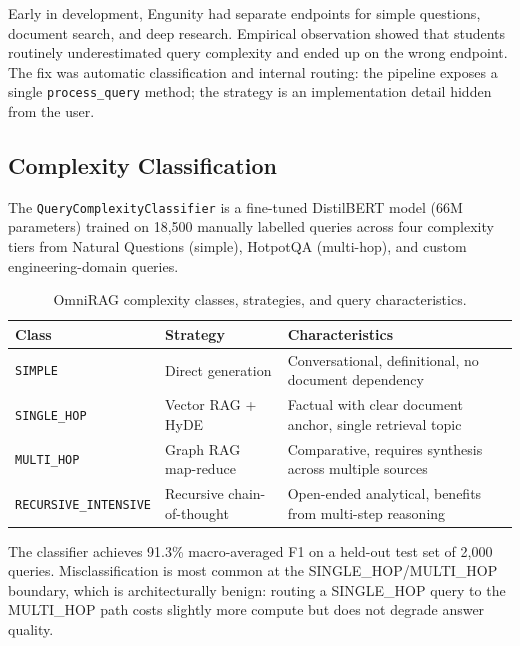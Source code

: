 Early in development, Engunity had separate endpoints for simple questions, document search, and deep research. Empirical observation showed that students routinely underestimated query complexity and ended up on the wrong endpoint. The fix was automatic classification and internal routing: the pipeline exposes a single \texttt{process\_query} method; the strategy is an implementation detail hidden from the user.

\subsection{Complexity Classification}
\label{subsec:complexity-classifier}

The \texttt{QueryComplexityClassifier} is a fine-tuned DistilBERT model (66M parameters) trained on 18,500 manually labelled queries across four complexity tiers from Natural Questions (simple), HotpotQA (multi-hop), and custom engineering-domain queries.

\begin{table}[ht]
    \centering
    \caption{OmniRAG complexity classes, strategies, and query characteristics.}
    \label{tab:complexity}
    \renewcommand{\arraystretch}{1.3}
    \begin{tabular}{llp{5cm}}
        \toprule
        \textbf{Class} & \textbf{Strategy} & \textbf{Characteristics} \\
        \midrule
        \texttt{SIMPLE} & Direct generation & Conversational, definitional, no document dependency \\
        \texttt{SINGLE\_HOP} & Vector RAG + HyDE & Factual with clear document anchor, single retrieval topic \\
        \texttt{MULTI\_HOP} & Graph RAG map-reduce & Comparative, requires synthesis across multiple sources \\
        \texttt{RECURSIVE\_INTENSIVE} & Recursive chain-of-thought & Open-ended analytical, benefits from multi-step reasoning \\
        \bottomrule
    \end{tabular}
\end{table}

The classifier achieves 91.3\% macro-averaged F1 on a held-out test set of 2,000 queries. Misclassification is most common at the SINGLE\_HOP/MULTI\_HOP boundary, which is architecturally benign: routing a SINGLE\_HOP query to the MULTI\_HOP path costs slightly more compute but does not degrade answer quality.

